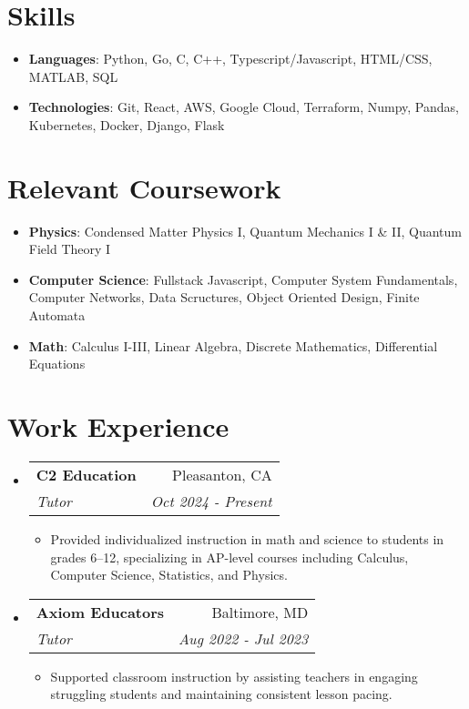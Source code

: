 \documentclass[letterpaper,11pt]{article}
\makeatletter
\newcommand{\resumeItem}[2]{
  \item\small{
    \textbf{#1}{: #2 \vspace{-2pt}}
  }
}
\newcommand{\resumeSubheading}[4]{
  \vspace{-1pt}\item
    \begin{tabular*}{0.97\textwidth}{l@{\extracolsep{\fill}}r}
      \textbf{#1} & #2 \\
      \textit{\small#3} & \textit{\small #4} \\
    \end{tabular*}\vspace{-5pt}
}
\newcommand{\resumeSubItem}[2]{\resumeItem{#1}{#2}\vspace{-4pt}}
\newcommand{\resumeSubHeadingListStart}{\begin{itemize}[leftmargin=*]}
\newcommand{\resumeSubHeadingListEnd}{\end{itemize}}
\makeatother
\begin{document}
\section{Skills}
  \resumeSubHeadingListStart
    \resumeSubItem{Languages}
      {Python, Go, C, C++, Typescript/Javascript, HTML/CSS, MATLAB, SQL}
    \resumeSubItem{Technologies}
      {Git, React, AWS, Google Cloud, Terraform, Numpy, Pandas, Kubernetes, Docker, Django, Flask}
  \resumeSubHeadingListEnd

%
\section{Relevant Coursework}
 \resumeSubHeadingListStart
   \resumeSubItem{Physics}{Condensed Matter Physics I, Quantum Mechanics I \& II, Quantum Field Theory I}
   \resumeSubItem{Computer Science}{Fullstack Javascript, Computer System Fundamentals, Computer Networks, Data Scructures, Object Oriented Design, Finite Automata}
   \resumeItem{Math}{Calculus I-III, Linear Algebra, Discrete Mathematics, Differential Equations}
 \resumeSubHeadingListEnd




\section{Work Experience}
  \resumeSubHeadingListStart

    \resumeSubheading
      {C2 Education}{Pleasanton, CA}
      {Tutor}{Oct 2024 - Present}
      \begin{itemize}[leftmargin=*]
          \item Provided individualized instruction in math and science to students in grades 6–12, specializing in AP-level courses including Calculus, Computer Science, Statistics, and Physics.
      \end{itemize}

    \resumeSubheading
      {Axiom Educators}{Baltimore, MD}
      {Tutor}{Aug 2022 - Jul 2023}
      \begin{itemize}[leftmargin=*]
          \item Supported classroom instruction by assisting teachers in engaging struggling students and maintaining consistent lesson pacing.
      \end{itemize}
      
  \resumeSubHeadingListEnd
\end{document}
